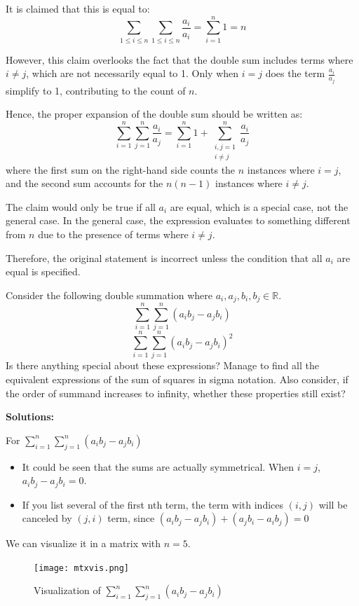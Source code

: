 It is claimed that this is equal to:
\[
\sum_{1 \leq i \leq n} \sum_{1 \leq i \leq n} \frac{a_i}{a_i} = \sum_{i=1}^{n} 1 = n
\]

However, this claim overlooks the fact that the double sum includes terms where \( i \neq j \), which are not necessarily equal to 1. Only when \( i = j \) does the term \( \frac{a_i}{a_j} \) simplify to 1, contributing to the count of \( n \).

Hence, the proper expansion of the double sum should be written as:
\[
\sum_{i=1}^{n} \sum_{j=1}^{n} \frac{a_i}{a_j} = \sum_{i=1}^{n} 1 + \sum_{\substack{i,j=1 \\ i \neq j}}^{n} \frac{a_i}{a_j}
\]
where the first sum on the right-hand side counts the \( n \) instances where \( i = j \), and the second sum accounts for the \( n(n-1) \) instances where \( i \neq j \).

The claim would only be true if all \( a_i \) are equal, which is a special case, not the general case. In the general case, the expression evaluates to something different from \( n \) due to the presence of terms where \( i \neq j \). 

Therefore, the original statement is incorrect unless the condition that all \( a_i \) are equal is specified.

\begin{exercise}
    Consider the following double summation where $a_i, a_j, b_i, b_j \in \mathbb{R}$.
    $$\sum_{i=1}^{n} \sum_{j=1}^{n} (a_ib_j-a_jb_i)$$
    $$\sum_{i=1}^{n} \sum_{j=1}^{n} (a_ib_j-a_jb_i)^2$$
    Is there anything special about these expressions? Manage to find all the equivalent expressions of
    the sum of squares in sigma notation. Also consider, if the order of summand increases to infinity, 
    whether these properties still exist?
\end{exercise}
\textbf{Solutions:}

For $\sum_{i=1}^{n} \sum_{j=1}^{n} (a_ib_j-a_jb_i)$
\begin{itemize}
    \item It could be seen that the sums are actually symmetrical. When $i=j$, $a_ib_j-a_jb_i=0$.
    \item If you list several of the first nth term, the term with indices $(i, j)$ will be canceled by $(j, i)$ term, since $(a_ib_j-a_jb_i)+(a_jb_i-a_ib_j)=0$ 
\end{itemize} 
We can visualize it in a matrix with $n=5$.
\begin{figure}[H]
    \centering
    \texttt{[image: mtxvis.png]}
    \caption{Visualization of $\sum_{i=1}^{n} \sum_{j=1}^{n} (a_ib_j-a_jb_i)$}
\end{figure}

